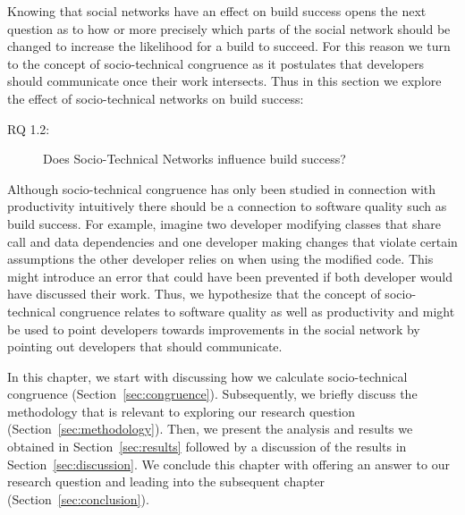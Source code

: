 \label{chap:stc-net2}
Knowing that social networks have an effect on build success opens the next question as to how or more precisely which parts of the social network should be changed to increase the likelihood for a build to succeed.
For this reason we turn to the concept of socio-technical congruence as it postulates that developers should communicate once their work intersects.
Thus in this section we explore the effect of socio-technical networks on build success:

\begin{description}
  \item[RQ 1.2:] Does Socio-Technical Networks influence build success?
\end{description}

Although socio-technical congruence has only been studied in connection with productivity intuitively there should be a connection to software quality such as build success.
For example, imagine two developer modifying classes that share call and data dependencies and one developer making changes that violate certain assumptions the other developer relies on when using the modified code.
This might introduce an error that could have been prevented if both developer would have discussed their work.
Thus, we hypothesize that the concept of socio-technical congruence relates to software quality as well as productivity and might be used to point developers towards improvements in the social network by pointing out developers that should communicate.

In this chapter, we start with discussing how we calculate socio-technical congruence (Section~\ref{sec:congruence}).
Subsequently, we briefly discuss the methodology that is relevant to exploring our research question (Section~\ref{sec:methodology}).
Then, we present the analysis and results we obtained in Section~\ref{sec:results} followed by a discussion of the results in Section~\ref{sec:discussion}.
We conclude this chapter with offering an answer to our research question and leading into the subsequent chapter (Section~\ref{sec:conclusion}).


